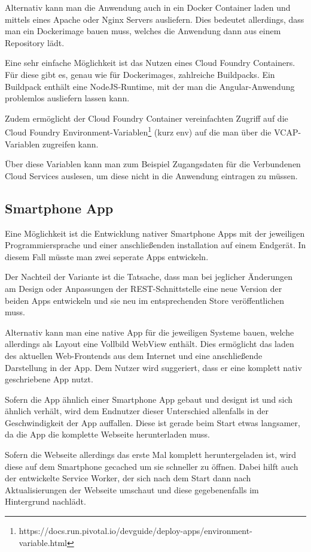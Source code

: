 Alternativ kann man die Anwendung auch in ein Docker Container laden und mittels eines Apache oder Nginx Servers
ausliefern. Dies bedeutet allerdings, dass man ein Dockerimage bauen muss, welches die Anwendung dann aus einem
Repository lädt.

Eine sehr einfache Möglichkeit ist das Nutzen eines Cloud Foundry Containers. Für diese gibt es, genau wie für
Dockerimages, zahlreiche Buildpacks. Ein Buildpack enthält eine NodeJS-Runtime, mit der man die Angular-Anwendung
problemlos ausliefern lassen kann.

Zudem ermöglicht der Cloud Foundry Container vereinfachten Zugriff auf die Cloud Foundry
Environment-Variablen\footnote{https://docs.run.pivotal.io/devguide/deploy-apps/environment-variable.html} (kurz env)
auf die man über die VCAP-Variablen zugreifen kann.

Über diese Variablen kann man zum Beispiel Zugangsdaten für die Verbundenen Cloud Services auslesen, um diese nicht in
die Anwendung eintragen zu müssen.

\subsection{Smartphone App}
Eine Möglichkeit ist die Entwicklung nativer Smartphone Apps mit der jeweiligen Programmiersprache und einer
anschließenden installation auf einem Endgerät. In diesem Fall müsste man zwei seperate Apps entwickeln.

Der Nachteil der Variante ist die Tatsache, dass man bei jeglicher Änderungen am Design oder Anpassungen der
REST-Schnittstelle eine neue Version der beiden Apps entwickeln und sie neu im entsprechenden Store veröffentlichen
muss.

Alternativ kann man eine native App für die jeweiligen Systeme bauen, welche allerdings als Layout eine Vollbild WebView
enthält. Dies ermöglicht das laden des aktuellen Web-Frontends aus dem Internet und eine anschließende Darstellung in
der App. Dem Nutzer wird suggeriert, dass er eine komplett nativ geschriebene App nutzt.

Sofern die App ähnlich einer Smartphone App gebaut und designt ist und sich ähnlich verhält, wird dem Endnutzer dieser
Unterschied allenfalls in der Geschwindigkeit der App auffallen. Diese ist gerade beim Start etwas langsamer, da die
App die komplette Webseite herunterladen muss.

Sofern die Webseite allerdings das erste Mal komplett heruntergeladen ist, wird diese auf dem Smartphone gecached um sie
schneller zu öffnen. Dabei hilft auch der entwickelte Service Worker, der sich nach dem Start dann nach Aktualisierungen
der Webseite umschaut und diese gegebenenfalls im Hintergrund nachlädt.

